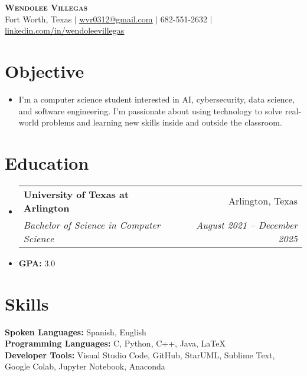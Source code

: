\documentclass[letterpaper,11pt]{article}
\makeatletter
\newcommand{\resumeItem}[1]{
  \item\small{
    {#1 \vspace{-2pt}}
  }
}
\newcommand{\resumeSubheading}[4]{
  \vspace{-2pt}\item
    \begin{tabular*}{0.97\textwidth}[t]{l@{\extracolsep{\fill}}r}
      \textbf{#1} & #2 \\
      \textit{\small#3} & \textit{\small #4} \\
    \end{tabular*}\vspace{-7pt}
}
\newcommand{\resumeSubHeadingListStart}{\begin{itemize}[leftmargin=0.15in, label={}]}
\newcommand{\resumeSubHeadingListEnd}{\end{itemize}}
\makeatother
\begin{document}

\begin{center}
    \textbf{\Huge \scshape Wendolee Villegas} \\ \vspace{1pt}
    \small Fort Worth, Texas $|$ \href{mailto:x@x.com}{\underline{wvr0312@gmail.com}} $|$ \small 682-551-2632
    $|$ \href{https://linkedin.com/in/wendolee-villegas-565440252/}{\underline{linkedin.com/in/wendoleevillegas}}
\end{center}

\section{Objective}
\resumeSubHeadingListStart
    \resumeItem{I'm a computer science student interested in AI, cybersecurity, data science, and software engineering. I’m passionate 
    about using technology to solve real-world problems and learning new skills inside and outside the classroom. 
    }
\resumeSubHeadingListEnd


\section{Education}
  \resumeSubHeadingListStart
    \resumeSubheading
      {University of Texas at Arlington}{Arlington, Texas}
      {Bachelor of Science in Computer Science}{August 2021 -- December 2025}
      \resumeItem{\textbf{GPA:} 3.0}
  \resumeSubHeadingListEnd

\section{Skills}
 \begin{itemize}[leftmargin=0.15in, label={}]
    \small{\item{
      \textbf{Spoken Languages:}{ Spanish, English} \\
      \textbf{Programming Languages:}{ C, Python, C++, Java, LaTeX} \\
      \textbf{Developer Tools:}{ Visual Studio Code, GitHub, StarUML, Sublime Text, Google Colab, Jupyter Notebook, Anaconda} \\
     }}
 \end{itemize}
\end{document}
